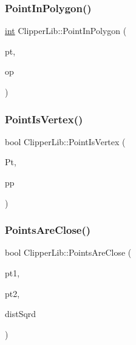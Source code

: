 \mbox{\label{namespace_clipper_lib_a35576f17125b022fdc726cbc4cb1ea50}} 
\subsubsection{\texorpdfstring{PointInPolygon()}{PointInPolygon()}\hspace{0.1cm}{\footnotesize\ttfamily [2/2]}}
{\footnotesize\ttfamily \mbox{\hyperlink{draw_8hh_aa620a13339ac3a1177c86edc549fda9b}{int}} Clipper\+Lib\+::\+Point\+In\+Polygon (\begin{DoxyParamCaption}\item[{const \mbox{\hyperlink{struct_clipper_lib_1_1_int_point}{Int\+Point}} \&}]{pt,  }\item[{\mbox{\hyperlink{struct_clipper_lib_1_1_out_pt}{Out\+Pt}} $\ast$}]{op }\end{DoxyParamCaption})}

\mbox{\label{namespace_clipper_lib_aa0616b922b887c38de1f2af2eee82357}} 
\subsubsection{\texorpdfstring{PointIsVertex()}{PointIsVertex()}}
{\footnotesize\ttfamily bool Clipper\+Lib\+::\+Point\+Is\+Vertex (\begin{DoxyParamCaption}\item[{const \mbox{\hyperlink{struct_clipper_lib_1_1_int_point}{Int\+Point}} \&}]{Pt,  }\item[{\mbox{\hyperlink{struct_clipper_lib_1_1_out_pt}{Out\+Pt}} $\ast$}]{pp }\end{DoxyParamCaption})}

\mbox{\label{namespace_clipper_lib_a52757887bc031d0052ae95dccb83cd2c}} 
\subsubsection{\texorpdfstring{PointsAreClose()}{PointsAreClose()}}
{\footnotesize\ttfamily bool Clipper\+Lib\+::\+Points\+Are\+Close (\begin{DoxyParamCaption}\item[{\mbox{\hyperlink{struct_clipper_lib_1_1_int_point}{Int\+Point}}}]{pt1,  }\item[{\mbox{\hyperlink{struct_clipper_lib_1_1_int_point}{Int\+Point}}}]{pt2,  }\item[{double}]{dist\+Sqrd }\end{DoxyParamCaption})}

